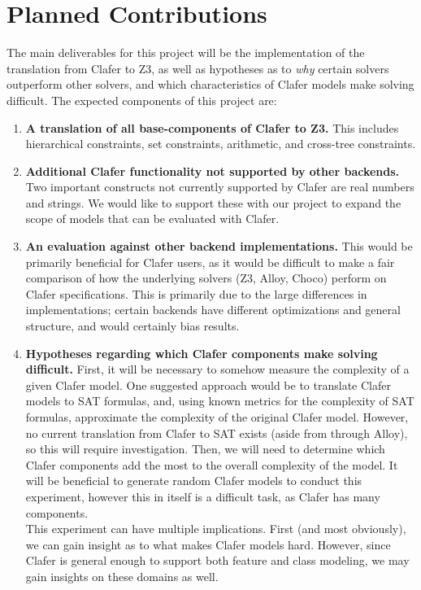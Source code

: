 \documentclass{article}
\begin{document}
\section{Planned Contributions}
The main deliverables for this project will be the implementation of the translation from Clafer to Z3, as well as hypotheses as to \textit{why} certain solvers outperform other solvers, and which characteristics of Clafer models make solving difficult. The expected components of this project are: 
\begin{enumerate}
\item \textbf{A translation of all base-components of Clafer to Z3.} This includes hierarchical constraints, set constraints, arithmetic, and cross-tree constraints. 
\item \textbf{Additional Clafer functionality not supported by other backends.} Two important constructs not currently supported by Clafer are real numbers and strings. We would like to support these with our project to expand the scope of models that can be evaluated with Clafer. 

\item \textbf{An evaluation against other backend implementations.} This would be primarily beneficial for Clafer users, as it would be difficult to make a fair comparison of how the underlying solvers (Z3, Alloy, Choco) perform on Clafer specifications. This is primarily due to the large differences in implementations; certain backends have different optimizations and general structure, and would certainly bias results.

\item \textbf{Hypotheses regarding which Clafer components make solving difficult.} First, it will be necessary to somehow measure the complexity of a given Clafer model. One suggested approach would be to translate Clafer models to SAT formulas, and, using known metrics for the complexity of SAT formulas, approximate the complexity of the original Clafer model. However, no current translation from Clafer to SAT exists (aside from through Alloy), so this will require investigation. Then, we will need to determine which Clafer components add the most to the overall complexity of the model. It will be beneficial to generate random Clafer models to conduct this experiment, however this in itself is a difficult task, as Clafer has many components. \\
\indent This experiment can have multiple implications. First (and most obviously), we can gain insight as to what makes Clafer models hard. However, since Clafer is general enough to support both feature and class modeling, we may gain insights on these domains as well.

\end{enumerate}




\end{document}
